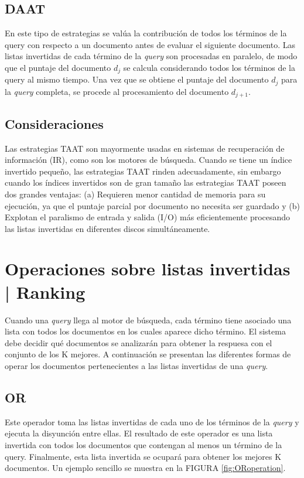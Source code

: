 \subsection{DAAT}
En este tipo de estrategias se valúa la contribución de todos los términos de la query con respecto a un documento antes de evaluar el siguiente documento. Las listas invertidas de cada término de la \textit{query} son procesadas en paralelo, de modo que el puntaje del documento $d_{j}$ se calcula considerando todos los términos de la query al mismo tiempo. Una vez que se obtiene el puntaje del documento $d_{j}$ para la \textit{query} completa, se procede al procesamiento del documento $d_{j+1}$.

\subsection{Consideraciones}
Las estrategias TAAT son mayormente usadas en sistemas de recuperación de información (IR), como son los motores de búsqueda. 
Cuando se tiene un índice invertido pequeño, las estrategias TAAT rinden adecuadamente, sin embargo cuando los índices invertidos son de gran tamaño las estrategias TAAT poseen dos grandes ventajas: (a) Requieren menor cantidad de memoria para su ejecución, ya que el puntaje parcial por documento no necesita ser guardado y (b) Explotan el paralismo de entrada y salida (I/O) más eficientemente procesando las listas invertidas en diferentes discos simultáneamente.


\section{Operaciones sobre listas invertidas | Ranking}
\label{marco:osli}
Cuando una \textit{query} llega al motor de búsqueda, cada término tiene asociado una lista con todos los documentos en los cuales aparece dicho término. El sistema debe decidir qué documentos se analizarán para obtener la respuesa con el conjunto de los K mejores. 
A continuación se presentan las diferentes formas de operar los documentos pertenecientes a las listas invertidas de una \textit{query}.

\subsection{OR}
\label{marco:or}
Este operador toma las listas invertidas de cada uno de los términos de la \textit{query} y ejecuta la disyunción entre ellas. El resultado de este operador es una lista invertida con todos los documentos que contengan al menos un término de la query. Finalmente, esta lista invertida se ocupará para obtener los mejores K documentos. Un ejemplo sencillo se muestra en la FIGURA \ref{fig:ORoperation}.


